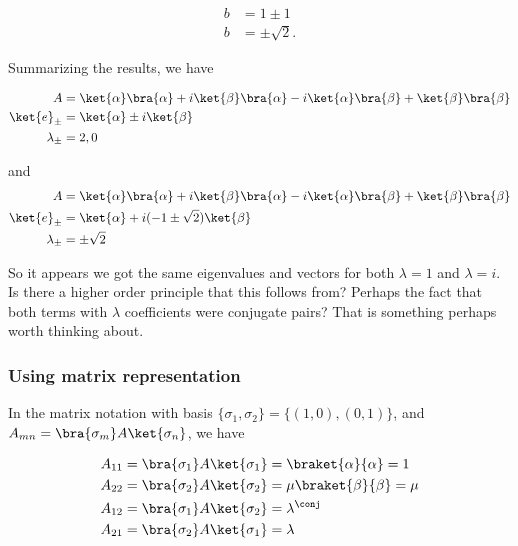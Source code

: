 \begin{align}\label{eqn:desaiDiracNotes:66j}
b &= 1 \pm 1 \\
b &= \pm \sqrt{2}.
\end{align}

Summarizing the results, we have

\begin{subequations}
\label{eqn:desaiDiracNotes:67ip}
\begin{align}
A &=
\ket{\alpha}\bra{\alpha}
+ i \ket{\beta}\bra{\alpha}
- i \ket{\alpha}\bra{\beta}
+ \ket{\beta}\bra{\beta} \\
\ket{e}_{\pm} &= \ket{\alpha} \pm i \ket{\beta} \\
\lambda_{\pm} &= 2, 0
\end{align}
\end{subequations}

and
\begin{subequations}
\label{eqn:desaiDiracNotes:67in}
\begin{align}
A &=
\ket{\alpha}\bra{\alpha}
+ i \ket{\beta}\bra{\alpha}
- i \ket{\alpha}\bra{\beta}
+ \ket{\beta}\bra{\beta} \\
\ket{e}_{\pm} &= \ket{\alpha} + i (-1 \pm \sqrt{2} ) \ket{\beta} \\
\lambda_{\pm} &= \pm \sqrt{2}
\end{align}
\end{subequations}

So it appears we got the same eigenvalues and vectors for both $\lambda = 1$ and $\lambda = i$.  Is there a higher order principle that this follows from?  Perhaps the fact that both terms with $\lambda$ coefficients were conjugate pairs?  That is something perhaps worth thinking about.

\subsubsection{Using matrix representation}

In the matrix notation with basis $\{\sigma_1, \sigma_2\} = \{(1,0), (0,1)\}$, and $A_{mn} = \bra{\sigma_m} A \ket{\sigma_n}$, we have

\begin{align*}%
A_{11} &= \bra{\sigma_1} A \ket{\sigma_1} = \braket{\alpha}{\alpha} = 1 \\
A_{22} &= \bra{\sigma_2} A \ket{\sigma_2} = \mu \braket{\beta}{\beta} = \mu \\
A_{12} &= \bra{\sigma_1} A \ket{\sigma_2} = \lambda^\conj \\
A_{21} &= \bra{\sigma_2} A \ket{\sigma_1} = \lambda
\end{align*}

